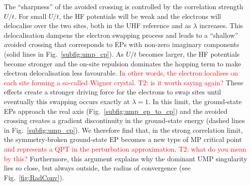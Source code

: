 \documentclass[aps,prb,reprint,noshowkeys,superscriptaddress]{revtex4-1}
\newcommand{\titou}[1]{\textcolor{red}{#1}}
\begin{document}
The ``sharpness'' of the avoided crossing is controlled by the correlation strength $U/t$.
For small $U/t$, the HF potentials will be weak and the electrons will delocalise over the two sites,
both in the UHF reference and as $\lambda$ increases.
This delocalisation dampens the electron swapping process and leads to a ``shallow'' avoided crossing
that corresponds to EPs with non-zero imaginary components (solid lines in Fig.~\ref{subfig:ump_cp}).
As $U/t$ becomes larger, the HF potentials become stronger and the on-site repulsion dominates the hopping
term to make electron delocalisation less favourable.
\titou{In other words, the electron localises on each site forming a so-called Wigner crystal.
T2: is it worth saying again?}
These effects create a stronger driving force for the electrons to swap sites until eventually this swapping
occurs exactly at $\lambda = 1$.
In this limit, the ground-state EPs approach the real axis (Fig.~\ref{subfig:ump_ep_to_cp}) and the avoided 
crossing creates a gradient discontinuity in the ground-state energy (dashed lines in Fig.~\ref{subfig:ump_cp}).
We therefore find that, in the strong correlation limit, the symmetry-broken ground-state EP becomes
a new type of MP critical point \titou{and represents a QPT in the perturbation approximation}.
\titou{T2: what do you mean by this?} 
Furthermore, this argument explains why the dominant UMP singularity lies so close, but always outside, the 
radius of convergence (see Fig.~\ref{fig:RadConv}).
\end{document}
